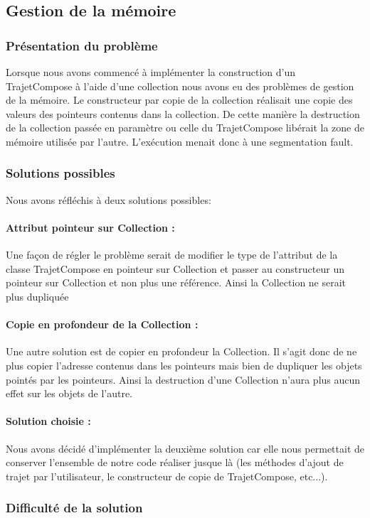 \documentclass[10pt,a4paper,twoside]{article}
\begin{document}
\subsection{Gestion de la mémoire}
\subsubsection{Présentation du problème}
Lorsque nous avons commencé à implémenter la construction d'un TrajetCompose à l'aide d'une collection nous avons eu des problèmes de gestion de la mémoire. Le constructeur par copie de la collection réalisait une copie des valeurs des pointeurs contenus dans la collection. De cette manière la destruction de la collection passée en paramètre ou celle du TrajetCompose libérait la zone de mémoire utilisée par l'autre. L'exécution menait donc à une segmentation fault.

\subsubsection{Solutions possibles}
Nous avons réfléchis à deux solutions possibles:
\paragraph{Attribut pointeur sur Collection :} Une façon de régler le problème serait de modifier le type de l'attribut de la classe TrajetCompose en pointeur sur Collection et passer au constructeur un pointeur sur Collection et non plus une référence. Ainsi la Collection ne serait plus dupliquée
\paragraph{Copie en profondeur de la Collection :} Une autre solution est de copier en profondeur la Collection. Il s'agit donc de ne plus copier l'adresse contenus dans les pointeurs mais bien de dupliquer les objets pointés par les pointeurs. Ainsi la destruction d'une Collection n'aura plus aucun effet sur les objets de l'autre.
\paragraph{Solution choisie :} Nous avons décidé d'implémenter la deuxième solution car elle nous permettait de conserver l'ensemble de notre code réaliser jusque là (les méthodes d'ajout de trajet par l'utilisateur, le constructeur de copie de TrajetCompose, etc...).

\subsubsection{Difficulté de la solution}
\end{document}
